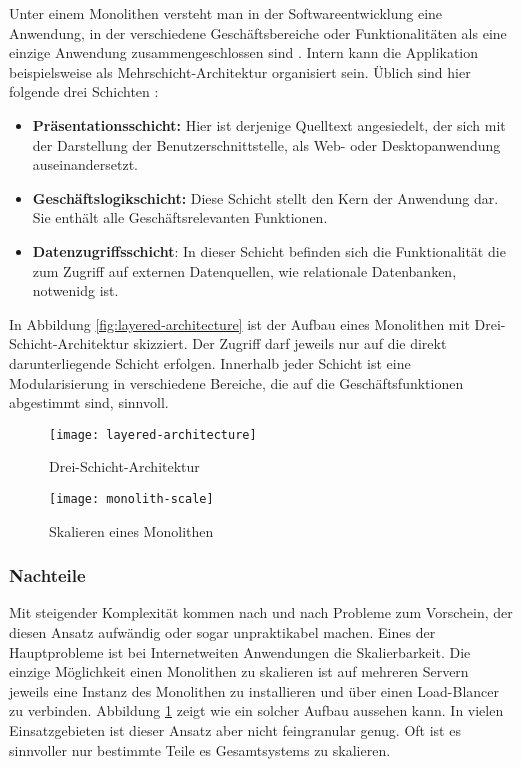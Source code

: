 Unter einem Monolithen versteht man in der Softwareentwicklung eine Anwendung, in der verschiedene Geschäftsbereiche oder Funktionalitäten als eine einzige Anwendung zusammengeschlossen sind \cite{FowlerMS}. Intern kann die Applikation beispielsweise als Mehrschicht-Architektur organisiert sein. Üblich sind hier folgende drei Schichten \cite{FowlerPEA}:

\begin{itemize}
	\item \textbf{Präsentationsschicht:} Hier ist derjenige Quelltext angesiedelt, der sich mit der Darstellung der Benutzerschnittstelle, \zB als Web- oder Desktopanwendung auseinandersetzt.
	\item \textbf{Geschäftslogikschicht:} Diese Schicht stellt den Kern der Anwendung dar. Sie enthält alle Geschäftsrelevanten Funktionen.
	\item \textbf{Datenzugriffsschicht}: In dieser Schicht befinden sich die Funktionalität die zum Zugriff auf externen Datenquellen, wie \zB relationale Datenbanken, notwenidg ist.
\end{itemize}


In Abbildung \ref{fig:layered-architecture} ist der Aufbau eines Monolithen mit Drei-Schicht-Architektur skizziert. Der Zugriff darf jeweils nur auf die direkt darunterliegende Schicht erfolgen. Innerhalb jeder Schicht ist eine Modularisierung in verschiedene Bereiche, die auf die Geschäftsfunktionen abgestimmt sind, sinnvoll.

\begin{figure}[!htb]
\centering
{}
  \centering
	\texttt{[image: layered-architecture]}
	\caption{Drei-Schicht-Architektur}
	\label{fig:layered-architecture}
\endminipage
{}
  \centering
	\texttt{[image: monolith-scale]}
	\caption{Skalieren eines Monolithen}
	\label{fig:monolith-scale}
\endminipage
\end{figure}

\subsubsection{Nachteile}

Mit steigender Komplexität kommen nach und nach Probleme zum Vorschein, der diesen Ansatz aufwändig oder sogar unpraktikabel machen. Eines der Hauptprobleme ist bei Internetweiten Anwendungen die Skalierbarkeit. Die einzige Möglichkeit einen Monolithen zu skalieren ist auf mehreren Servern jeweils eine Instanz des Monolithen zu installieren und über einen Load-Blancer zu verbinden. Abbildung \ref{fig:monolith-scale} zeigt wie ein solcher Aufbau aussehen kann. In vielen Einsatzgebieten ist dieser Ansatz aber nicht feingranular genug. Oft ist es sinnvoller nur bestimmte Teile es Gesamtsystems zu skalieren.

